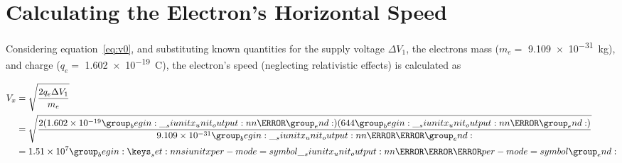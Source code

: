 \documentclass[twocolumn,english]{IEEEtran}
\theoremstyle{plain}
\theoremstyle{plain}
\begin{document}
\section{Calculating the Electron's Horizontal Speed}\label{vx_calc}

 Considering equation~\ref{eq:v0}, and substituting known quantities for the supply voltage $\Delta V_1$, the electrons mass ($m_e =$ \SI{9.109e-31}{\kilo\gram}), and charge ($q_e=$ \SI{1.602e-19}{\coulomb}), the electron's speed (neglecting relativistic effects) is calculated as

 \begin{align*}
   {V_x} &= \sqrt{\frac{2q_e \Delta V_1}{m_e}} \\
   &=\sqrt{\frac{2(1.602 \times 10^{-19}\si{\coulomb})(644\si{\volt})}{9.109 \times 10^{-31}\si{\kilo\gram}}} \\
   &=1.51 \times 10^7 \si[per-mode=symbol]{\metre\per\second}
 \end{align*}





\end{document}
